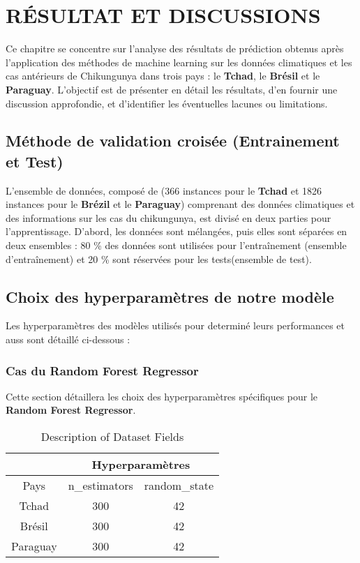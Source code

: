 \chapter{RÉSULTAT ET DISCUSSIONS}
Ce chapitre se concentre sur l’analyse des résultats de prédiction obtenus après l’application des méthodes de machine learning sur les données climatiques et les cas antérieurs de Chikungunya dans trois pays : le \textbf{Tchad}, le \textbf{Brésil} et le \textbf{Paraguay}. L’objectif est de présenter en détail les résultats, d’en fournir une discussion approfondie, et d’identifier les éventuelles lacunes ou limitations.

\section{Méthode de validation croisée (Entrainement et Test)}
L’ensemble de données, composé de (366 instances pour le \textbf{Tchad} et 1826 instances pour le \textbf{Brézil} et le \textbf{Paraguay}) comprenant des données climatiques et des informations sur les cas du chikungunya, est divisé en deux parties pour l’apprentissage. D’abord, les données sont mélangées, puis elles sont séparées en deux ensembles : 80 \% des données sont utilisées pour l’entraînement (ensemble d’entraînement) et 20 \% sont réservées pour les tests(ensemble de test).

\section{Choix des hyperparamètres de notre modèle}
Les hyperparamètres des modèles utilisés pour determiné leurs performances et auss sont détaillé ci-dessous :

\subsection{Cas du Random Forest Regressor}
Cette section détaillera les choix des hyperparamètres spécifiques pour le \textbf{Random Forest Regressor}.\\

\begin{table}[!hbt]
	\centering
	\begin{tabular}{|c|c|c|}
		\hline
		& \multicolumn{2}{c|}{Hyperparamètres} \\
		\hline
		Pays & n\_estimators & random\_state \\
		\hline
		Tchad & 300 & 42 \\
		\hline
		Brésil & 300 & 42 \\
		\hline
		Paraguay & 300 & 42 \\
		\hline
	\end{tabular}
	\caption{Description of Dataset Fields}
\end{table}

